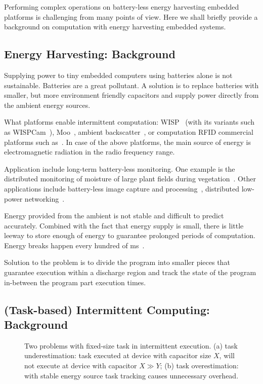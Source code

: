 Performing complex operations on battery-less energy harvesting embedded platforms is challenging from many points of view. Here we shall briefly provide a background on computation with energy harvesting embedded systems. 

\subsection{Energy Harvesting: Background}

Supplying power to tiny embedded computers using batteries alone is not sustainable. Batteries are a great pollutant. A solution is to replace batteries with smaller, but more environment friendly capacitors and supply power directly from the ambient energy sources. 

What platforms enable intermittent computation: WISP~\cite{} (with its variants such as WISPCam~\cite{}), Moo~\cite{}, ambient backscatter~\cite{}, or computation RFID commercial platforms such as~\cite{}. In case of the above platforms, the main source of energy is electromagnetic radiation in the radio frequency range.

Application include long-term battery-less monitoring. One example is the distributed monitoring of moisture of large plant fields during vegetation~\cite{}. Other applications include battery-less image capture and processing~\cite{}, distributed low-power networking~\cite{}.

Energy provided from the ambient is not stable and difficult to predict accurately. Combined with the fact that energy supply is small, there is little leeway to store enough of energy to guarantee prolonged periods of computation. Energy breaks happen every hundred of ms~\cite{}.

Solution to the problem is to divide the program into smaller pieces that guarantee execution within a discharge region and track the state of the program in-between the program part execution times. 

\subsection{(Task-based) Intermittent Computing: Background}

\begin{figure}
	\centering
	\caption{Two problems with fixed-size task in intermittent execution. (a) task underestimation: task executed at device with capacitor size $X$, will not execute at device with capacitor $X\gg Y$; (b) task overestimation: with stable energy source task tracking causes unnecessary overhead.}
	\label{fig:fixed_task_problem}
\end{figure}

